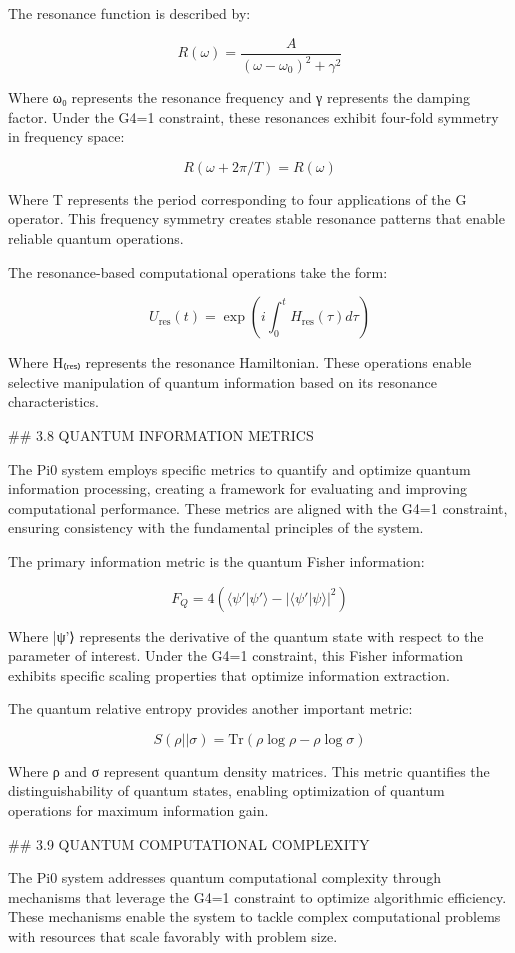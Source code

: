 The resonance function is described by:

$$R(\omega) = \frac{A}{(\omega - \omega_0)^2 + \gamma^2}$$

Where ω₀ represents the resonance frequency and γ represents the damping factor. Under the G4=1 constraint, these resonances exhibit four-fold symmetry in frequency space:

$$R(\omega + 2\pi/T) = R(\omega)$$

Where T represents the period corresponding to four applications of the G operator. This frequency symmetry creates stable resonance patterns that enable reliable quantum operations.

The resonance-based computational operations take the form:

$$U_{\text{res}}(t) = \exp\left(i\int_0^t H_{\text{res}}(\tau) d\tau\right)$$

Where H₍ᵣₑₛ₎ represents the resonance Hamiltonian. These operations enable selective manipulation of quantum information based on its resonance characteristics.

## 3.8 QUANTUM INFORMATION METRICS

The Pi0 system employs specific metrics to quantify and optimize quantum information processing, creating a framework for evaluating and improving computational performance. These metrics are aligned with the G4=1 constraint, ensuring consistency with the fundamental principles of the system.

The primary information metric is the quantum Fisher information:

$$F_Q = 4\left(\langle \psi'|\psi'\rangle - |\langle \psi'|\psi\rangle|^2\right)$$

Where |ψ'⟩ represents the derivative of the quantum state with respect to the parameter of interest. Under the G4=1 constraint, this Fisher information exhibits specific scaling properties that optimize information extraction.

The quantum relative entropy provides another important metric:

$$S(\rho||\sigma) = \text{Tr}(\rho\log\rho - \rho\log\sigma)$$

Where ρ and σ represent quantum density matrices. This metric quantifies the distinguishability of quantum states, enabling optimization of quantum operations for maximum information gain.

## 3.9 QUANTUM COMPUTATIONAL COMPLEXITY

The Pi0 system addresses quantum computational complexity through mechanisms that leverage the G4=1 constraint to optimize algorithmic efficiency. These mechanisms enable the system to tackle complex computational problems with resources that scale favorably with problem size.

